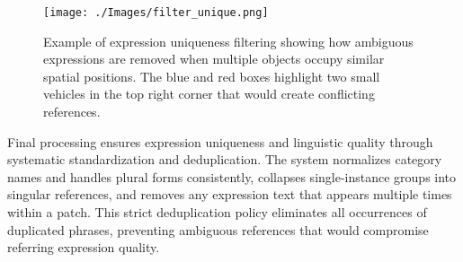 \begin{figure}[H]
\centering
\begin{minipage}{0.5\textwidth}
\centering
\texttt{[image: ./Images/filter\_unique.png]}
\end{minipage}%
\begin{minipage}{0.5\textwidth}
\centering
\hspace{-1cm}
\end{minipage}
\caption{Example of expression uniqueness filtering showing how ambiguous expressions are removed when multiple objects occupy similar spatial positions. The blue and red boxes highlight two small vehicles in the top right corner that would create conflicting references.}
\label{fig:uniqueness_filter}
\end{figure}

Final processing ensures expression uniqueness and linguistic quality through systematic standardization and deduplication. The system normalizes category names and handles plural forms consistently, collapses single-instance groups into singular references, and removes any expression text that appears multiple times within a patch. This strict deduplication policy eliminates all occurrences of duplicated phrases, preventing ambiguous references that would compromise referring expression quality.

